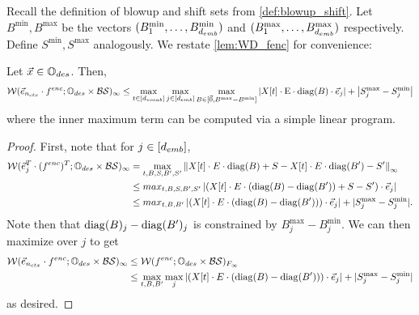 Recall the definition of blowup and shift sets from \cref{def:blowup_shift}.
			Let $B^{\min}, B^{\max}$ be the vectors $(B_1^{\min}, \dots, B_{d_{emb}}^{\min})$ and $(B_1^{\max}, \dots, B_{d_{emb}}^{\max})$ respectively.
			Define $S^{\min}, S^{\max}$ analogously.
			We restate \cref{lem:WD_fenc} for convenience:
			\begin{lemma}
				\label{lem:worst_case_deviation}
				Let $\vec{x} \in \mathbb{O}_{des}$.
				Then,
				\[
					\mathcal{W}(\vec{e}_{{n_{ctx}}} \cdot f^{enc}; \mathbb{O}_{des} \times \mathcal{B} \mathcal{S})_\infty \leq 
					\max_{t \in [{d_{vocab}}]} 
					\max_{j \in [{d_{emb}}]}
					\max_{B \in [\vec{0}, B^{\max} - B^{\min}]}
					\left|X[t] \cdot \text{E} \cdot \mathrm{diag}(B) \cdot \vec{e}_j\right| + \left|S_j^{\max} - S_j^{\min}  \right|
                    \]	
				where the inner maximum term can be computed via a simple linear program.
			\end{lemma}
			\begin{proof}
                    First, note that for $j \in [{d_{emb}}]$,
				\begin{align*}
					\mathcal{W}(\vec{e}_{j}^T \cdot (f^{enc})^T; \mathbb{O}_{des} \times \mathcal{B} \mathcal{S})_\infty 
						&= \max_{t, B, S, B', S'} \left\|
						X[t] \cdot E \cdot \mathrm{diag}(B) + S - X[t] \cdot E \cdot \mathrm{diag}(B') - S'
						\right\|_\infty \\
						&\leq max_{t, B, S, B', S'}
						\left|\left(X[t] \cdot E \cdot (\mathrm{diag}(B) - \mathrm{diag}(B')) + S - S'\right) \cdot \vec{e}_j\right| \\
						&\leq max_{t, B, B'}  \left|\left(X[t] \cdot E \cdot (\mathrm{diag}(B) - \mathrm{diag}(B')) \right) \cdot \vec{e}_j\right| + |S_j^{\max} - S_j^{\min}|.
				\end{align*}		
				Note then that $\mathrm{diag}(B)_j - \mathrm{diag}(B')_j$ is constrained by $B^{\max}_j - B^{\min}_j$.
                We can then maximize over $j$ to get
                \begin{align*}
                    \mathcal{W}(\vec{e}_{n_{ctx}} \cdot f^{enc}; \mathbb{O}_{des} \times \mathcal{B} \mathcal{S})_\infty 
                    &\leq 
                    \mathcal{W}(f^{enc}; \mathbb{O}_{des} \times \mathcal{B} \mathcal{S})_{F_{\infty}}  \\
                    &\leq \max_{t, B, B'} \max_j  \left|\left(X[t] \cdot E \cdot (\mathrm{diag}(B) - \mathrm{diag}(B')) \right) \cdot \vec{e}_j\right| + |S_j^{\max} - S_j^{\min}|
				\end{align*}
                as desired.
			\end{proof}



